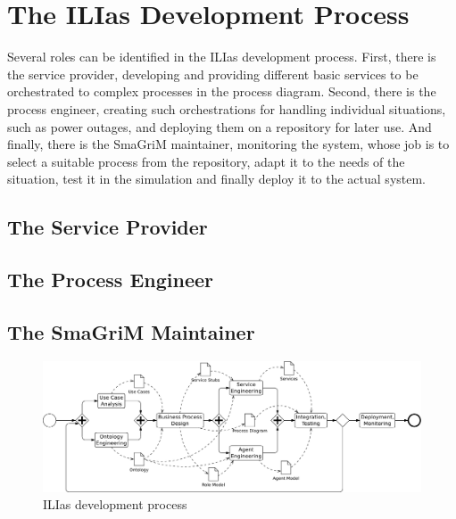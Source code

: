 
\section{The ILIas Development Process}

Several roles can be identified in the ILIas development process.  First, there
is the service provider, developing and providing different basic services to be
orchestrated to complex processes in the process diagram.  Second, there is the
process engineer, creating such orchestrations for handling individual situations,
such as power outages, and deploying them on a repository for later use.  And
finally, there is the SmaGriM maintainer, monitoring the system, whose job is to
select a suitable process from the repository, adapt it to the needs of the
situation, test it in the simulation and finally deploy it to the actual system.


\subsection{The Service Provider}

\subsection{The Process Engineer}

\subsection{The SmaGriM Maintainer}


\begin{figure}
	\centering
	\includegraphics[width=\textwidth]{figures/methodology.pdf}
	\caption{ILIas development process}
	\label{fig:ilias-process}
\end{figure}



